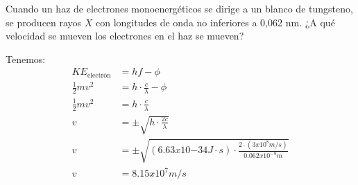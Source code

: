     
    \begin{problema}
    Cuando un haz de electrones monoenergéticos se dirige a un blanco de tungsteno, se producen rayos $X$ con longitudes de onda no inferiores a 0,062 $\mathrm{nm}$. ¿A qué velocidad se mueven los electrones en el haz se mueven?
    \begin{sol}
        Tenemos:
        \begin{align*}
            KE_{\text{electrón}} &= hf-\phi\\
            \frac{1}{2}mv^2 &= h\cdot \frac{c}{\lambda}-\phi\\
            \frac{1}{2}mv^2 &= h\cdot \frac{c}{\lambda}\\
            v &=\pm \sqrt{h\cdot \frac{2c}{\lambda}}\\
            v &=\pm \sqrt{(6.63x10{-34} J\cdot s)\cdot \frac{2\cdot (3x10^8 m/s)}{0.062x10^{-9}m}}\\
            v &= 8.15 x 10^{7}m/s
        \end{align*}
    \end{sol}
    
    \end{problema}
    
